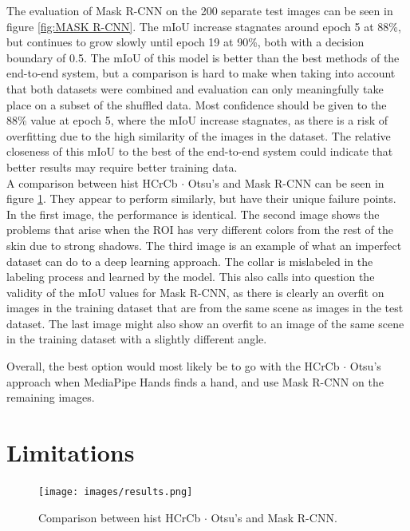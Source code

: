 \documentclass[conference]{IEEEtran}
\begin{document}
The evaluation of Mask R-CNN on the 200 separate test images can be seen in figure \ref{fig:MASK R-CNN}. The mIoU increase stagnates around epoch 5 at 88\%, but continues to grow slowly until epoch 19 at 90\%, both with a decision boundary of 0.5. The mIoU of this model is better than the best methods of the end-to-end system, but a comparison is hard to make when taking into account that both datasets were combined and evaluation can only meaningfully take place on a subset of the shuffled data. Most confidence should be given to the 88\% value at epoch 5, where the mIoU increase stagnates, as there is a risk of overfitting due to the high similarity of the images in the dataset. The relative closeness of this mIoU to the best of the end-to-end system could indicate that better results may require better training data. \\

A comparison between hist HCrCb $\cdot$ Otsu's and Mask R-CNN can be seen in figure \ref{fig:results}. They appear to perform similarly, but have their unique failure points. In the first image, the performance is identical. The second image shows the problems that arise when the ROI has very different colors from the rest of the skin due to strong shadows. The third image is an example of what an imperfect dataset can do to a deep learning approach. The collar is mislabeled in the labeling process and learned by the model. This also calls into question the validity of the mIoU values for Mask R-CNN, as there is clearly an overfit on images in the training dataset that are from the same scene as images in the test dataset. The last image might also show an overfit to an image of the same scene in the training dataset with a slightly different angle.

Overall, the best option would most likely be to go with the HCrCb $\cdot$ Otsu's approach when MediaPipe Hands finds a hand, and use Mask R-CNN on the remaining images.

\section{Limitations}

\begin{figure}[h]
	\begin{center}
		\texttt{[image: images/results.png]}
	\end{center}
	\caption{Comparison between hist HCrCb $\cdot$ Otsu's and Mask R-CNN.}
	\label{fig:results}
\end{figure}
\end{document}
